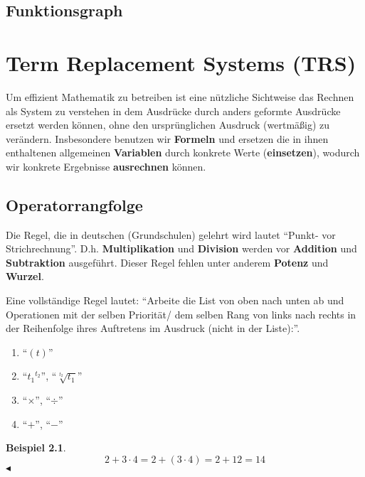 \documentclass[a4paper]{book}%
\newcommand{\topicend}{
      $\blacktriangleleft$
}
\theoremstyle{definition}
\newtheorem{beispiel}{Beispiel}
\begin{document}
\section{Funktionsgraph}



\chapter{Term Replacement Systems (TRS)}\label{TRS}

Um effizient Mathematik zu betreiben ist eine nützliche Sichtweise das Rechnen als System zu verstehen in dem Ausdrücke durch anders geformte Ausdrücke ersetzt werden können, ohne den ursprünglichen Ausdruck (wertmäßig) zu verändern. Insbesondere benutzen wir \textbf{Formeln} und ersetzen die in ihnen enthaltenen allgemeinen \textbf{Variablen} durch konkrete Werte (\textbf{einsetzen}), wodurch wir konkrete Ergebnisse \textbf{ausrechnen} können.


\section{Operatorrangfolge}

Die Regel, die in deutschen (Grundschulen) gelehrt wird lautet \enquote{Punkt- vor Strichrechnung}. D.h. \textbf{Multiplikation} und \textbf{Division} werden vor \textbf{Addition} und \textbf{Subtraktion} ausgeführt. Dieser Regel fehlen unter anderem \textbf{Potenz} und \textbf{Wurzel}.

Eine vollständige Regel lautet: \enquote{Arbeite die List von oben nach unten ab und Operationen mit der selben Priorität/ dem selben Rang von links nach rechts in der Reihenfolge ihres Auftretens im Ausdruck (nicht in der Liste):}.

\begin{enumerate}
  \item \enquote{$(t)$}
  \item \enquote{${t_1}^{t_2}$}, \enquote{$\sqrt[t_2]{t_1}$}
  \item \enquote{$\times$}, \enquote{$\div$}
  \item \enquote{$+$}, \enquote{$-$}
\end{enumerate}

\begin{beispiel}
    \begin{equation}
        2 + 3 \cdot 4 = 2 + (3 \cdot 4) = 2 + 12 = 14
    \end{equation}\topicend
\end{beispiel}
\end{document}
